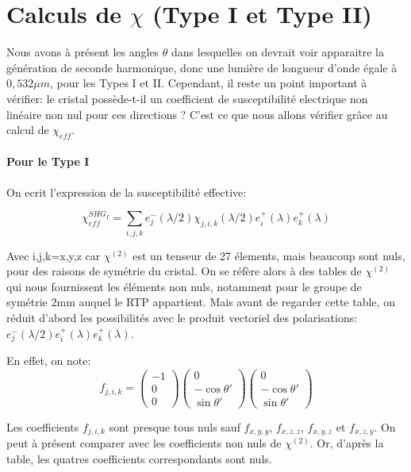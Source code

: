 \documentclass[a4paper,11pt]{report}
\begin{document}
\section{Calculs de $\chi$ (Type I et Type II)}

Nous avons à présent les angles $\theta$ dans lesquelles on devrait voir apparaitre la génération de seconde harmonique, donc une lumière de longueur d'onde égale à $0,532\mu m$, pour les Types I et II. Cependant, il reste un point important à vérifier: le  cristal possède-t-il un coefficient de susceptibilité electrique non linéaire non nul pour ces directions ? C'est ce que nous allons vérifier grâce au calcul de $\chi_{eff}$.

\paragraph{Pour le Type I}
On ecrit l'expression de la susceptibilité effective:

\[\chi_{eff}^{SHG_I}=\sum_{i,j,k}e^-_j(\lambda/2)\chi_{j,i,k}(\lambda/2)e^+_i(\lambda)e^+_k(\lambda)\]

Avec {i,j,k}={x,y,z} car $\chi^{(2)}$ est un tenseur de 27 élements, mais beaucoup sont nuls, pour des raisons de symétrie du cristal. On se réfère alors à des tables de $\chi^{(2)}$ qui nous fournissent les éléments non nuls, notamment pour le groupe de symétrie 2mm auquel le RTP appartient. Mais avant de regarder cette table, on réduit d'abord les possibilités avec le produit vectoriel des polarisations: $e^-_j(\lambda/2)e^+_i(\lambda)e^+_k(\lambda)$.

En effet, on note:
\[f_{j,i,k}=\begin{pmatrix}-1\\0\\0\end{pmatrix}\begin{pmatrix}0\\-\cos\theta'\\\sin\theta'\end{pmatrix}\begin{pmatrix}0\\-\cos\theta'\\\sin\theta'\end{pmatrix}\]

Les coefficients $f_{j,i,k}$ sont presque tous nuls sauf $f_{x,y,y}$, $f_{x,z,z}$, $f_{x,y,z}$ et $f_{x,z,y}$. 
On peut à présent comparer avec les coefficients non nuls de $\chi^{(2)}$. Or, d'après la table, les quatres coefficients correspondants sont nuls.
\end{document}
